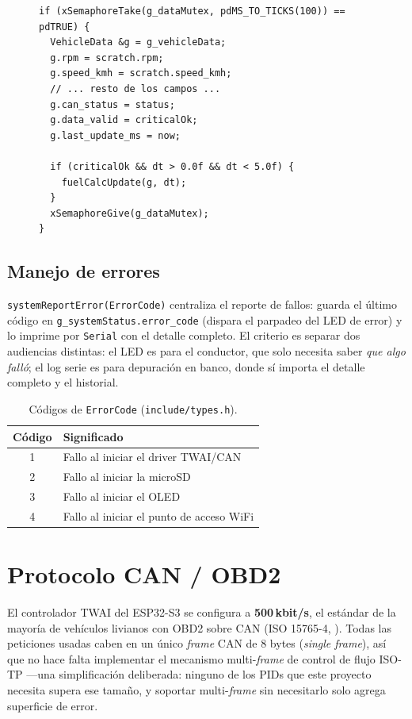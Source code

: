 \begin{figure}[H]
\begin{lstlisting}[caption={Fusión bajo mutex al final de cada ciclo, \texttt{src/can\_obd2.cpp}.}, label={fig:merge}]
if (xSemaphoreTake(g_dataMutex, pdMS_TO_TICKS(100)) == pdTRUE) {
  VehicleData &g = g_vehicleData;
  g.rpm = scratch.rpm;
  g.speed_kmh = scratch.speed_kmh;
  // ... resto de los campos ...
  g.can_status = status;
  g.data_valid = criticalOk;
  g.last_update_ms = now;

  if (criticalOk && dt > 0.0f && dt < 5.0f) {
    fuelCalcUpdate(g, dt);
  }
  xSemaphoreGive(g_dataMutex);
}
\end{lstlisting}
\end{figure}

\subsection{Manejo de errores}
\texttt{systemReportError(ErrorCode)} centraliza el reporte de fallos: guarda
el último código en \texttt{g\_systemStatus.error\_code} (dispara el parpadeo
del LED de error) y lo imprime por \texttt{Serial} con el detalle completo.
El criterio es separar dos audiencias distintas: el LED es para el
conductor, que solo necesita saber \textit{que algo falló}; el log serie es
para depuración en banco, donde sí importa el detalle completo y el
historial.

\begin{table}[H]
\centering
\caption{Códigos de \texttt{ErrorCode} (\texttt{include/types.h}).}
\begin{tabular}{@{}cl@{}}
\toprule
Código & Significado \\
\midrule
1 & Fallo al iniciar el driver TWAI/CAN \\
2 & Fallo al iniciar la microSD \\
3 & Fallo al iniciar el OLED \\
4 & Fallo al iniciar el punto de acceso WiFi \\
\bottomrule
\end{tabular}
\end{table}

\section{Protocolo CAN / OBD2}

El controlador TWAI del ESP32-S3 se configura a \textbf{500\,kbit/s}, el
estándar de la mayoría de vehículos livianos con OBD2 sobre CAN
(ISO 15765-4, \cite{iso157654}). Todas las
peticiones usadas caben en un único \textit{frame} CAN de 8 bytes
(\textit{single frame}), así que no hace falta implementar el mecanismo
multi-\textit{frame} de control de flujo ISO-TP —una simplificación
deliberada: ninguno de los PIDs que este proyecto necesita supera ese
tamaño, y soportar multi-\textit{frame} sin necesitarlo solo agrega
superficie de error.

